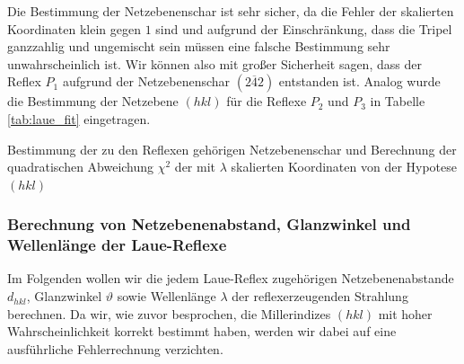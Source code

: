 \documentclass[11pt, a4paper]{article}
\begin{document}
Die Bestimmung der Netzebenenschar ist sehr sicher, da die Fehler der skalierten Koordinaten klein gegen $1$ sind und aufgrund der Einschränkung, dass die Tripel ganzzahlig und ungemischt sein müssen eine falsche Bestimmung sehr unwahrscheinlich ist.
Wir können also mit großer Sicherheit sagen, dass der Reflex $P_1$ aufgrund der Netzebenenschar $(2\overline{4}2)$ entstanden ist.
Analog wurde die Bestimmung der Netzebene $(hkl)$ für die Reflexe $P_2$ und $P_3$ in Tabelle \ref{tab:laue_fit} eingetragen.
\begin{table}[h]
\centering
\resizebox{\columnwidth}{!}{%
}
\caption{Bestimmung der zu den Reflexen gehörigen Netzebenenschar und Berechnung der quadratischen Abweichung $\chi^2$ der mit $\lambda$ skalierten Koordinaten von der Hypotese $(hkl)$}
\label{tab:laue_fit}
\end{table}


\subsubsection{Berechnung von Netzebenenabstand, Glanzwinkel und Wellenlänge der Laue-Reflexe}
Im Folgenden wollen wir die jedem Laue-Reflex zugehörigen Netzebenenabstande $d_{hkl}$, Glanzwinkel $\vartheta$ sowie Wellenlänge $\lambda$ der reflexerzeugenden Strahlung berechnen.
Da wir, wie zuvor besprochen, die Millerindizes $(hkl)$ mit hoher Wahrscheinlichkeit korrekt bestimmt haben, werden wir dabei auf eine ausführliche Fehlerrechnung verzichten.
\end{document}
